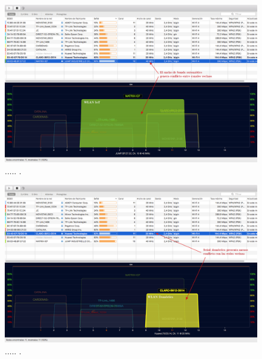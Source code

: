 
\begin{landscape} %
\begin{figure}[htpb]
\centering 
\includegraphics[width=1.5\textwidth]{./Figures/wifi/02.png}
\caption{..... .}
\label{fig:test02}
\end{figure}
\end{landscape} %


\begin{landscape} %
\begin{figure}[htpb]
\centering 
\includegraphics[width=1.5\textwidth]{./Figures/wifi/03.png}
\caption{..... .}
\label{fig:test03}
\end{figure}
\end{landscape} %


